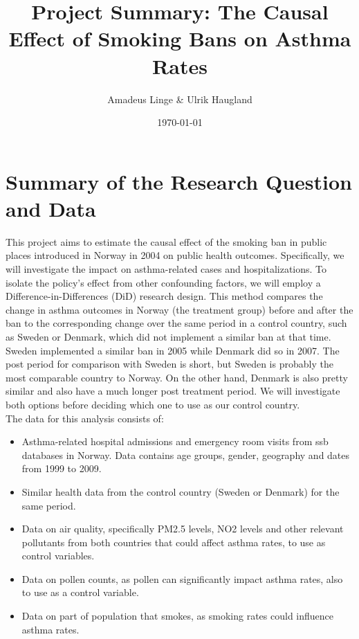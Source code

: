 \documentclass[12pt, a4paper]{article}
\title{\textbf{Project Summary: The Causal Effect of Smoking Bans on Asthma Rates}}
\author{Amadeus Linge \& Ulrik Haugland}
\date{\today}
\begin{document}
\maketitle
\thispagestyle{empty} 

\vspace{-1.5cm} 
\section{Summary of the Research Question and Data}

This project aims to estimate the causal effect of the smoking ban in public places introduced in Norway in 2004 on public health outcomes. Specifically, we will investigate the impact on asthma-related cases and hospitalizations.
To isolate the policy's effect from other confounding factors, we will employ a Difference-in-Differences (DiD) research design. This method compares the change in asthma outcomes in Norway (the treatment group) before and after the ban to the corresponding change over the same period in a control country, such as Sweden or Denmark, which did not implement a similar ban at that time. 
\\

Sweden implemented a similar ban in 2005 while Denmark did so in 2007. The post period for comparison with Sweden is short, but Sweden is probably the most comparable country to Norway. On the other hand, Denmark is also pretty similar and also have a much longer post treatment period. We will investigate both options before deciding which one to use as our control country.
\\

The data for this analysis consists of:

\begin{itemize}
    \item Asthma-related hospital admissions and emergency room visits from ssb databases in Norway. Data contains age groups, gender, geography and dates from 1999 to 2009.
    \item Similar health data from the control country (Sweden or Denmark) for the same period.
    \item Data on air quality, specifically PM2.5 levels, NO2 levels and other relevant pollutants from both countries that could affect asthma rates, to use as control variables.
    \item Data on pollen counts, as pollen can significantly impact asthma rates, also to use as a control variable.
    \item Data on part of population that smokes, as smoking rates could influence asthma rates.
\end{itemize}
\end{document}
